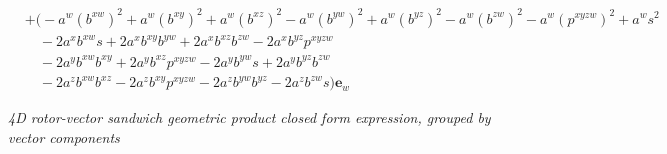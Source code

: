 \documentclass{l4proj}
\begin{document}
\begin{appendices}
\begin{equation}
\begin{aligned}
  & + \Big( - a^{w} {\left ( b^{xw} \right )}^{2} + a^{w} {\left ( b^{xy} \right )}^{2} + a^{w} {\left ( b^{xz} \right )}^{2} - a^{w} {\left ( b^{yw} \right )}^{2} + a^{w} {\left ( b^{yz} \right )}^{2} - a^{w} {\left ( b^{zw} \right )}^{2} - a^{w} {\left ( p^{xyzw} \right )}^{2} + a^{w} s^{2} \\
  & \quad - 2 a^{x} b^{xw} s + 2 a^{x} b^{xy} b^{yw} + 2 a^{x} b^{xz} b^{zw} - 2 a^{x} b^{yz} p^{xyzw} \\
  & \quad - 2 a^{y} b^{xw} b^{xy} + 2 a^{y} b^{xz} p^{xyzw} - 2 a^{y} b^{yw} s + 2 a^{y} b^{yz} b^{zw} \\
  & \quad - 2 a^{z} b^{xw} b^{xz} - 2 a^{z} b^{xy} p^{xyzw} - 2 a^{z} b^{yw} b^{yz} - 2 a^{z} b^{zw} s \Big) \boldsymbol{e}_{w}  
  \end{aligned}
\end{equation}

\textit{4D rotor-vector sandwich geometric product closed form expression, grouped by vector components}


\end{appendices}
\end{document}
